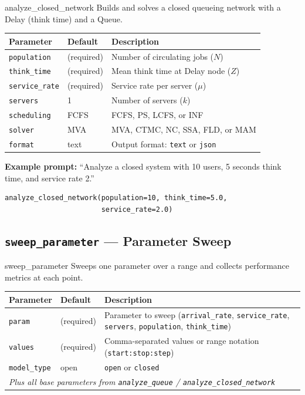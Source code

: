 \documentclass[11pt]{article}
\begin{document}
\begin{toolbox}{analyze\_closed\_network}
Builds and solves a closed queueing network with a Delay (think time) and a Queue.
\vspace{4pt}

\begin{tabularx}{\textwidth}{llX}
\toprule
\textbf{Parameter} & \textbf{Default} & \textbf{Description} \\
\midrule
\texttt{population} & (required) & Number of circulating jobs ($N$) \\
\texttt{think\_time} & (required) & Mean think time at Delay node ($Z$) \\
\texttt{service\_rate} & (required) & Service rate per server ($\mu$) \\
\texttt{servers} & 1 & Number of servers ($k$) \\
\texttt{scheduling} & FCFS & FCFS, PS, LCFS, or INF \\
\texttt{solver} & MVA & MVA, CTMC, NC, SSA, FLD, or MAM \\
\texttt{format} & text & Output format: \texttt{text} or \texttt{json} \\
\bottomrule
\end{tabularx}
\end{toolbox}

\noindent\textbf{Example prompt:} ``Analyze a closed system with 10 users, 5 seconds think time, and service rate 2.''

\begin{lstlisting}[style=pythonstyle]
analyze_closed_network(population=10, think_time=5.0,
                       service_rate=2.0)
\end{lstlisting}

\subsection{\texttt{sweep\_parameter} --- Parameter Sweep}

\begin{toolbox}{sweep\_parameter}
Sweeps one parameter over a range and collects performance metrics at each point.
\vspace{4pt}

\begin{tabularx}{\textwidth}{llX}
\toprule
\textbf{Parameter} & \textbf{Default} & \textbf{Description} \\
\midrule
\texttt{param} & (required) & Parameter to sweep (\texttt{arrival\_rate}, \texttt{service\_rate}, \texttt{servers}, \texttt{population}, \texttt{think\_time}) \\
\texttt{values} & (required) & Comma-separated values or range notation (\texttt{start:stop:step}) \\
\texttt{model\_type} & open & \texttt{open} or \texttt{closed} \\
\multicolumn{3}{l}{\textit{Plus all base parameters from \texttt{analyze\_queue} / \texttt{analyze\_closed\_network}}} \\
\bottomrule
\end{tabularx}
\end{toolbox}
\end{document}
